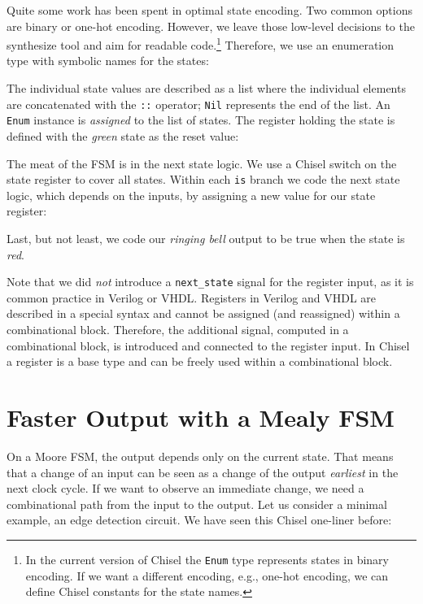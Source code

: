 \documentclass[%
    10pt,
    headinclude, footexclude,
    openright, %
    notitlepage,
    cleardoubleempty,
    headsepline,
    pointlessnumbers,
    bibtotoc, idxtotoc,
    ]{scrbook}
\newcommand{\code}[1]{{\small{\texttt{#1}}}}
\begin{document}
\noindent Quite some work has been spent in optimal state encoding. Two common options
are binary or one-hot encoding. However, we leave those low-level decisions to
the synthesize tool and aim for readable code.\footnote{In the current version
of Chisel the \code{Enum} type represents states in binary encoding.
If we want a different encoding, e.g., one-hot encoding, we can define Chisel
constants for the state names.}
Therefore, we use an enumeration type with symbolic names for the states:


\noindent The individual state values are described as a list where the individual
elements are concatenated with the \code{::} operator; \code{Nil} represents
the end of the list. An \code{Enum} instance is \emph{assigned} to the list of states.
The register holding the state is defined with the \emph{green} state as the reset value:




\noindent The meat of the FSM is in the next state logic. We use a Chisel switch on the
state register to cover all states. Within each \code{is} branch we code the next state
logic, which depends on the inputs, by assigning a new value for our state register:


\noindent Last, but not least, we code our \emph{ringing bell} output to be true when
the state is \emph{red}.


Note that we did \emph{not} introduce a \code{next\_state} signal for the register input,
as it is common practice in Verilog or VHDL.
Registers in Verilog and VHDL are described in a special syntax and cannot
be assigned (and reassigned) within a combinational block.
Therefore, the additional signal, computed in a combinational block, is
introduced and connected to the register input.
In Chisel a register is a base type and can be freely used within a combinational block.

\section{Faster Output with a Mealy FSM}

On a Moore FSM, the output depends only on the current state.
That means that a change of an input can be seen as a change of the
output \emph{earliest} in the next clock cycle.
If we want to observe an immediate change, we need a combinational
path from the input to the output.
Let us consider a minimal example, an edge detection circuit.
We have seen this Chisel one-liner before:
\end{document}
